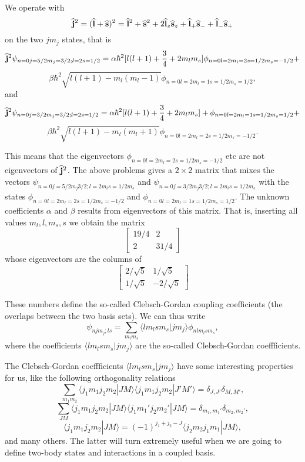 \begin{enumerate}
We operate with 
\[
   {\bf\widehat{j}}^2=({\bf\widehat{l}}+{\bf\widehat{s}})^2={\bf\widehat{l}}^2+{\bf\widehat{s}}^2+2{\bf\widehat{l}}_z{\bf\widehat{s}}_z+{\bf\widehat{l}}_+{\bf\widehat{s}}_{-}+{\bf\widehat{l}}_{-}{\bf\widehat{s}}_{+}
\]
on the two $jm_j$ states, that is
\[
{\bf\widehat{j}}^2\psi_{n=0j=5/2m_j=3/2;l=2s=1/2}= \alpha\hbar^2[l(l+1)+\frac{3}{4}+2m_lm_s]\phi_{n=0l=2m_l=2s=1/2m_s=-1/2}+
\]
\[
\beta\hbar^2\sqrt{l(l+1)-m_l(m_l-1)}\phi_{n=0l=2m_l=1s=1/2m_s=1/2},
\]
and 
\[
{\bf\widehat{j}}^2\psi_{n=0j=3/2m_j=3/2;l=2s=1/2}= \alpha\hbar^2[l(l+1)+\frac{3}{4}+2m_lm_s]+ \phi_{n=0l=2m_l=1s=1/2m_s=1/2}+
\]
\[
\beta\hbar^2\sqrt{l(l+1)-m_l(m_l+1)}\phi_{n=0l=2m_l=2s=1/2m_s=-1/2}.
\]

This means that the eigenvectors $\phi_{n=0l=2m_l=2s=1/2m_s=-1/2}$ etc are not eigenvectors of ${\bf\widehat{j}}^2$. The above problems gives a $2\times2$ matrix that mixes the vectors $\psi_{n=0j=5/2m_j3/2;l=2m_ls=1/2m_s}$ and $\psi_{n=0j=3/2m_j3/2;l=2m_ls=1/2m_s}$ with the states  $\phi_{n=0l=2m_l=2s=1/2m_s=-1/2}$ and
$\phi_{n=0l=2m_l=1s=1/2m_s=1/2}$. The unknown coefficients $\alpha$ and $\beta$ results from eigenvectors of this matrix. That is, inserting all values $m_l,l,m_s,s$ we obtain the matrix 
\[
\left[ \begin{array} {cc} 19/4 & 2 \\ 2 & 31/4 \end{array} \right]\]
whose eigenvectors are the columns of
\[
\left[ \begin{array} {cc} 2/\sqrt{5} &1/\sqrt{5}  \\ 1/\sqrt{5} & -2/\sqrt{5} \end{array}\right]\]  

These numbers define the so-called Clebsch-Gordan coupling coefficients  (the overlaps between the two basis sets). We can thus write
\[
\psi_{njm_j;ls}=\sum_{m_lm_s}\langle lm_lsm_s|jm_j\rangle\phi_{nlm_lsm_s},
\]
where the coefficients $\langle lm_lsm_s|jm_j\rangle$ are the so-called Clebsch-Gordan coeffficients.

The Clebsch-Gordan coeffficients $\langle lm_lsm_s|jm_j\rangle$ have some interesting properties for us, like the following 
orthogonality relations
\[
\sum_{m_1m_2}\langle j_1m_1j_2m_2|JM\rangle\langle j_1m_1j_2m_2|J'M'\rangle=\delta_{J,J'}\delta_{M,M'},
\]
\[
\sum_{JM}\langle j_1m_1j_2m_2|JM\rangle\langle j_1m_1'j_2m_2'|JM\rangle=\delta_{m_1,m_1'}\delta_{m_2,m_2'},
\]
\[
\langle j_1m_1j_2m_2|JM\rangle=(-1)^{j_1+j_2-J}\langle j_2m_2j_1m_1|JM\rangle,
\]
and many others. The latter will turn extremely useful when we are going to define two-body states and interactions in a coupled basis.


\end{enumerate}
